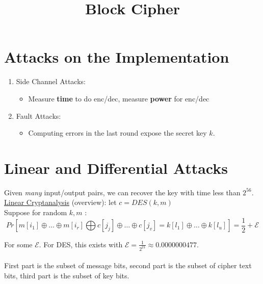 \documentclass[a4paper]{article}
\begin{document}
	\title{Block Cipher}
	\maketitle
	\medskip
	
	\section{Attacks on the Implementation}
	\begin{enumerate}
		\item Side Channel Attacks:
			\begin{itemize}
				\item Measure \textbf{time} to do enc/dec, measure \textbf{power} for enc/dec
			\end{itemize}
		\item Fault Attacks:
			\begin{itemize}
				\item Computing errors in the last round expose the secret key $k$.
			\end{itemize}
	\end{enumerate}

	\section{Linear and Differential Attacks}
	Given \textit{many} input/output pairs, we can recover the key with time less than $2^{56}$.\\
	\underline{Linear Cryptanalysis} (overview): let $c = DES\left( k,m \right) $\\
	Suppose for random $k,m$ :\\
	\begin{equation}
		\label{eq:pr}
		Pr\left[ m\left[ i_1 \right] \oplus \ldots\oplus m\left[ i_r \right] \bigoplus c\left[ j_j \right] \oplus \ldots \oplus c\left[ j_v \right] = k\left[ l_1 \right] \oplus \ldots \oplus k\left[ l_u \right]  \right] = \frac{1}{2} + \mathcal{E}
	\end{equation}
	 
	For some $\mathcal{E}$. For DES, this exists with  $\mathcal{E}= \frac{1}{2^{21}} \approx 0.0000000477$.\\\\
	First part is the subset of message bits, second part is the subset of cipher text bits, third
	part is the subset of key bits.\\
\end{document}
